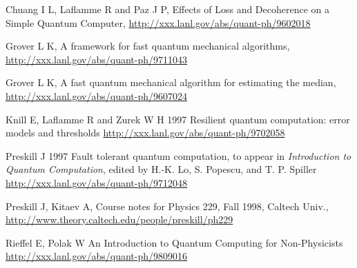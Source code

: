 \documentclass{article}
\def\pagedone{\newpage}
\begin{document}
 Chuang I L, Laflamme R and Paz J P, 
Effects of Loss and Decoherence on a Simple Quantum Computer,
\hyperref{http://xxx.lanl.gov/abs/quant-ph/9602018}{}{}
{http://xxx.lanl.gov/abs/quant-ph/9602018}

 Grover L K, 
A framework for fast quantum mechanical algorithms,
\hyperref{http://xxx.lanl.gov/abs/quant-ph/9711043}{}{}
{http://xxx.lanl.gov/abs/quant-ph/9711043}

 Grover L K, 
A fast quantum mechanical algorithm for estimating the median,
\hyperref{http://xxx.lanl.gov/abs/quant-ph/9607024}{}{}
{http://xxx.lanl.gov/abs/quant-ph/9607024}


Knill E, Laflamme R and Zurek W H 1997
Resilient quantum computation: error models and thresholds
\hyperref{http://xxx.lanl.gov/abs/quant-ph/9702058}{}{}
{http://xxx.lanl.gov/abs/quant-ph/9702058}

\pagedone


Preskill J 1997
Fault tolerant quantum computation,
to appear in {\it Introduction to Quantum
Computation},  edited by H.-K. Lo, S. Popescu, and T. P. Spiller
\hyperref{http://xxx.lanl.gov/abs/quant-ph/9712048}{}{}
{http://xxx.lanl.gov/abs/quant-ph/9712048}

Preskill J, Kitaev A, Course notes for Physics 229, Fall 1998, Caltech Univ.,
\hyperref{http://www.theory.caltech.edu/people/preskill/ph229}{}{}
{http://www.theory.caltech.edu/people/preskill/ph229}


Rieffel E, Polak W
An Introduction to Quantum Computing for Non-Physicists
\hyperref{http://xxx.lanl.gov/abs/quant-ph/9809016}{}{}
{http://xxx.lanl.gov/abs/quant-ph/9809016}
\end{document}
